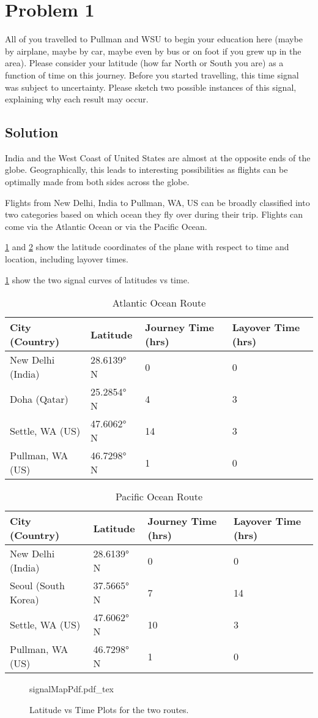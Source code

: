 \section{Problem 1}
 
 All of you travelled to Pullman and WSU to begin your education here (maybe by airplane, maybe by car, maybe even by bus or on foot if you grew up in the area). Please consider your latitude (how far North or South you are) as a function of time on this journey. Before you started travelling, this time signal was subject to uncertainty. Please sketch two possible instances of this signal, explaining why each result may occur.
 
\subsection{Solution}

India and the West Coast of United States are almost at the opposite ends of the globe. Geographically, this leads to interesting possibilities as flights can be optimally made from both sides across the globe.

Flights from New Delhi, India to Pullman, WA, US can be broadly classified into two categories based on which ocean they fly over during their trip. Flights can come via the Atlantic Ocean or via the Pacific Ocean.

\cref{tab:AtlanticRoute} and \cref{tab:pacificRoute} show the latitude coordinates of the plane with respect to time and location, including layover times.

\cref{fig:signalMaps} show the two signal curves of latitudes vs time.

\begin{table}[!htpb]
	\centering
	\caption{Atlantic Ocean Route}
	\label{tab:AtlanticRoute}
	\begin{tabular}{llll}
		\toprule
		City (Country) & Latitude & Journey Time (hrs) & Layover Time (hrs)\\
		\midrule
		New Delhi (India)& 28.6139° N & 0 & 0\\
		Doha (Qatar) & 25.2854° N & 4 & 3\\
		Settle, WA (US) & 47.6062° N & 14 & 3 \\
		Pullman, WA (US) & 46.7298° N & 1 & 0\\
		\bottomrule
	\end{tabular}
\end{table}

\begin{table}[!htpb]
	\centering
	\caption{Pacific Ocean Route}
	\label{tab:pacificRoute}
	\begin{tabular}{llll}
		\toprule
		City (Country) & Latitude & Journey Time (hrs) & Layover Time (hrs)\\
		\midrule
		New Delhi (India)& 28.6139° N & 0 & 0 \\
		Seoul (South Korea) & 37.5665° N & 7 & 14 \\
		Settle, WA (US) & 47.6062° N & 10 & 3 \\
		Pullman, WA (US) & 46.7298° N & 1 & 0 \\
		\bottomrule
	\end{tabular}
\end{table}

\begin{figure}[!htpb]
	\centering
	{signalMapPdf.pdf_tex}
	\caption{Latitude vs Time Plots for the two routes.}
	\label{fig:signalMaps}
\end{figure}